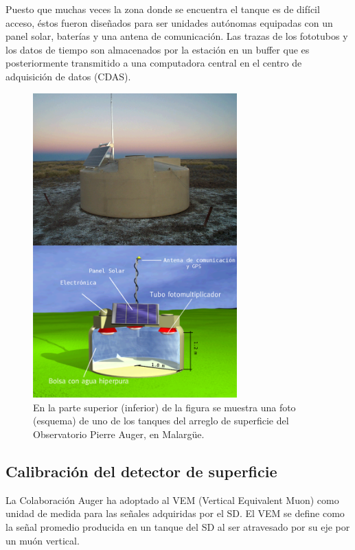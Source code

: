 	Puesto que muchas veces la zona donde se encuentra el tanque es de dif\'icil acceso, \'estos fueron diseñados para ser unidades aut\'onomas equipadas con un panel solar, bater\'ias y una antena de comunicaci\'on.
	Las trazas de los fototubos y los datos de tiempo son almacenados por la estaci\'on en un buffer que es posteriormente transmitido a una computadora central en el centro de adquisici\'on de datos (CDAS).
	
	\begin{figure}[h!]
		\begin{center}
		\includegraphics[width=0.7\textwidth]{fig/detectorAuger/Tanque00}
		\caption{\label{fig:tanque} En la parte superior (inferior) de la figura se muestra una foto (esquema) de uno de los tanques del arreglo de superficie del Observatorio Pierre Auger, en Malarg\"ue.}
		\end{center}
	\end{figure}

		\subsection{Calibraci\'on del detector de superficie}
		
		La Colaboraci\'on Auger ha adoptado al VEM (Vertical Equivalent Muon) como unidad de medida para las señales adquiridas por el SD.
		El VEM se define como la señal promedio producida en un tanque del SD al ser atravesado por su eje por un mu\'on vertical.
		
